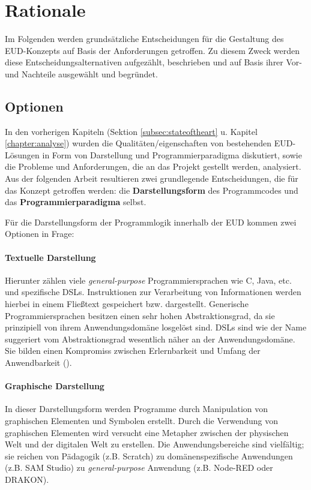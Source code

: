 \section{Rationale}\label{sec:einleitungkonzept}
Im Folgenden werden grundsätzliche Entscheidungen für die Gestaltung des \ac{EUD}-Kon\-zepts auf Basis der Anforderungen getroffen. Zu diesem Zweck werden diese Entscheidungsalternativen aufgezählt, beschrieben und auf Basis ihrer Vor- und Nachteile ausgewählt und begründet.

\subsection{Optionen}\label{subsec:optionen}
In den vorherigen Kapiteln (Sektion \ref{subsec:stateoftheart} u. Kapitel \ref{chapter:analyse}) wurden die Qualitäten/eigenschaften von bestehenden \ac{EUD}-Lösungen in Form von Darstellung und Programmierparadigma diskutiert, sowie die Probleme und Anforderungen, die an das Projekt gestellt werden, analysiert. Aus der folgenden Arbeit resultieren zwei grundlegende Entscheidungen, die für das Konzept getroffen werden: die \textbf{Darstellungsform} des Programmcodes und das \textbf{Programmierparadigma} selbst. 

Für die Darstellungsform der Programmlogik innerhalb der \ac{EUD} kommen zwei Optionen in Frage:
\paragraph{Textuelle Darstellung} Hierunter zählen viele \textit{general-purpose} Programmiersprachen wie C, Java, etc. und spezifische \acp{DSL}. Instruktionen zur Verarbeitung von Informationen werden hierbei in einem Fließtext gespeichert bzw. dargestellt. Generische Programmiersprachen besitzen einen sehr hohen Abstraktionsgrad, da sie prinzipiell von ihrem Anwendungsdomäne losgelöst sind. \acp{DSL} sind wie der Name suggeriert vom Abstraktionsgrad wesentlich näher an der Anwendungsdomäne. Sie bilden einen Kompromiss zwischen Erlernbarkeit und Umfang der Anwendbarkeit (\cite{green1991comprehensibility}).

\paragraph{Graphische Darstellung} In dieser Darstellungsform werden Programme durch Manipulation von graphischen Elementen und Symbolen erstellt. Durch die Verwendung von graphischen Elementen wird versucht eine Metapher zwischen der physischen Welt und der digitalen Welt zu erstellen. Die Anwendungsbereiche sind vielfältig; sie reichen von Pädagogik (z.B. Scratch) zu domänenspezifische Anwendungen (z.B. SAM Studio) zu \textit{general-purpose} Anwendung (z.B. Node-RED oder DRAKON). 

